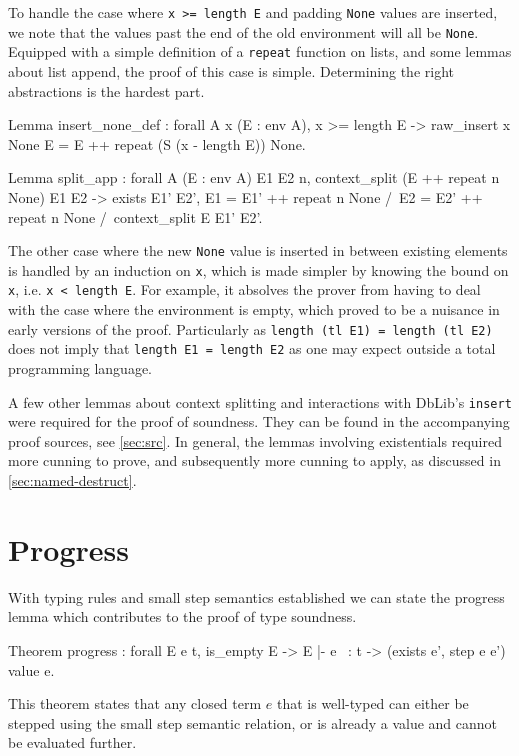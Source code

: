 \documentclass[]{unswthesis}
\let\c\texttt
\begin{document}
To handle the case where \c{x >= length E} and padding \c{None} values are inserted, we note that the values past the end of the old environment will all be \c{None}. Equipped with a simple definition of a \c{repeat} function on lists, and some lemmas about list append, the proof of this case is simple. Determining the right abstractions is the hardest part.

\begin{coqcode}
Lemma insert_none_def : forall A x (E : env A),
  x >= length E ->
  raw_insert x None E = E ++ repeat (S (x - length E)) None.

Lemma split_app : forall A (E : env A) E1 E2 n,
    context_split (E ++ repeat n None) E1 E2 ->
    exists E1' E2',
      E1 = E1' ++ repeat n None /\
      E2 = E2' ++ repeat n None /\
      context_split E E1' E2'.
\end{coqcode}

The other case where the new \c{None} value is inserted in between existing elements is handled by an induction on \c{x}, which is made simpler by knowing the bound on \c{x}, i.e. \c{x < length E}. For example, it absolves the prover from having to deal with the case where the environment is empty, which proved to be a nuisance in early versions of the proof. Particularly as \c{length (tl E1) = length (tl E2)} does not imply that \c{length E1 = length E2} as one may expect outside a total programming language.

A few other lemmas about context splitting and interactions with DbLib's \c{insert} were required for the proof of soundness. They can be found in the accompanying proof sources, see \cref{sec:src}. In general, the lemmas involving existentials required more cunning to prove, and subsequently more cunning to apply, as discussed in \cref{sec:named-destruct}.

\section{Progress}
\label{sec:progress}

With typing rules and small step semantics established we can state the progress lemma which contributes to the proof of type soundness.

\begin{coqcode}
Theorem progress : forall E e t,
  is_empty E ->
  E |- e ~: t ->
  (exists e', step e e') \/ value e.
\end{coqcode}

This theorem states that any closed term $e$ that is well-typed can either be stepped using the small step semantic relation, or is already a value and cannot be evaluated further.
\end{document}
